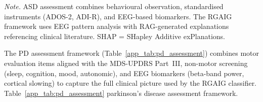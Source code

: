 \vspace{0.5em}\noindent\textit{Note.} ASD assessment combines behavioural observation, standardised instruments (ADOS-2, ADI-R), and EEG-based biomarkers. The RGAIG framework uses EEG pattern analysis with RAG-generated explanations referencing clinical literature. SHAP = SHapley Additive exPlanations.

\noindent The PD assessment framework (Table~\ref{app_tab:pd_assessment}) combines motor evaluation items aligned with the MDS-UPDRS Part~III, non-motor screening (sleep, cognition, mood, autonomic), and EEG biomarkers (beta-band power, cortical slowing) to capture the full clinical picture used by the RGAIG classifier.
\noindent Table~\ref{app_tab:pd_assessment} parkinson's disease assessment framework.

